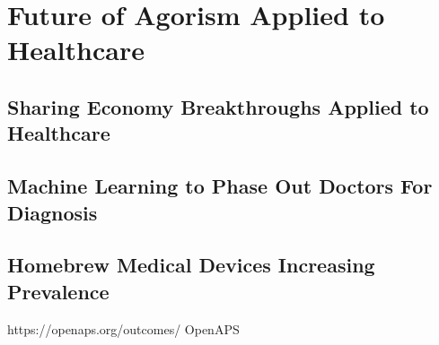 \documentclass{article}
\begin{document}
\section{Future of Agorism Applied to Healthcare}

\subsection{Sharing Economy Breakthroughs Applied to Healthcare}


\subsection{Machine Learning to Phase Out Doctors For Diagnosis}

\subsection{Homebrew Medical Devices Increasing Prevalence}


\cite{carson2010homebrew}


\cite{lausted2004posam}




https://openaps.org/outcomes/
OpenAPS
\cite{lewis2015introducing}





\cite{OpenSourceHealthcare}
\cite{MarketsNotCapitalism}
\cite{carsonhealthcare}



\end{document}
